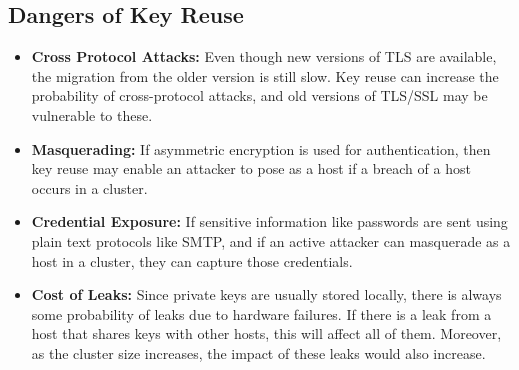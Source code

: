 \subsection{Dangers of Key Reuse}
\begin{itemize}
    \item \textbf{Cross Protocol Attacks:} Even though new versions of TLS are available, the migration from the older version is still slow. 
    Key reuse can increase the probability of cross-protocol attacks, and old versions of TLS/SSL may be vulnerable to these. 
    \item \textbf{Masquerading:} If asymmetric encryption is used for authentication, then key reuse may enable an attacker to pose as a host if 
    a breach of a host occurs in a cluster. 
    \item \textbf{Credential Exposure:} If sensitive information like passwords are sent using plain text protocols like SMTP, and if an 
    active attacker can masquerade as a host in a cluster, they can capture those credentials. 
    \item \textbf{Cost of Leaks:} Since private keys are usually stored locally, there is always some probability of leaks due to hardware failures. 
    If there is a leak from a host that shares keys with other hosts, this will affect all of them. Moreover, as the cluster size increases, the impact 
    of these leaks would also increase. 
\end{itemize}